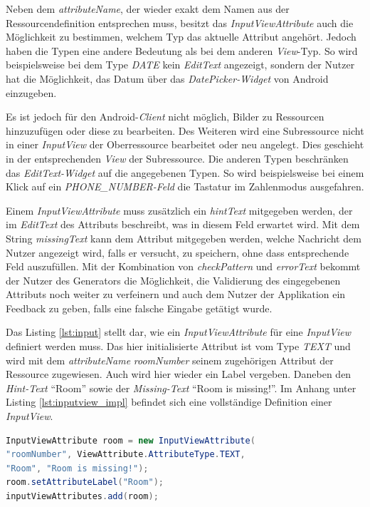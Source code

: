 Neben dem \textit{attributeName}, der wieder exakt dem Namen aus der Ressourcendefinition entsprechen muss, besitzt das \textit{InputViewAttribute} auch die Möglichkeit zu bestimmen, welchem Typ das aktuelle Attribut angehört. Jedoch haben die Typen eine andere Bedeutung als bei dem anderen \textit{View}-Typ. So wird beispielsweise bei dem Type \textit{DATE} kein \textit{EditText} angezeigt, sondern der Nutzer hat die Möglichkeit, das Datum über das \textit{DatePicker-Widget} von Android einzugeben. 

Es ist jedoch für den Android-\textit{Client} nicht möglich, Bilder zu Ressourcen hinzuzufügen oder diese zu bearbeiten. Des Weiteren wird eine Subressource nicht in einer \textit{InputView} der Oberressource bearbeitet oder neu angelegt. Dies geschieht in der entsprechenden \textit{View} der Subressource. Die anderen Typen beschränken das \textit{EditText-Widget} auf die angegebenen Typen. So wird beispielsweise bei einem Klick auf ein \textit{PHONE\_NUMBER-Feld} die Tastatur im Zahlenmodus ausgefahren.

Einem \textit{InputViewAttribute} muss zusätzlich ein \textit{hintText} mitgegeben werden, der im \textit{EditText} des Attributs beschreibt, was in diesem Feld erwartet wird. Mit dem String \textit{missingText} kann dem Attribut mitgegeben werden, welche Nachricht dem Nutzer angezeigt wird, falls er versucht, zu speichern, ohne dass entsprechende Feld auszufüllen. Mit der Kombination von \textit{checkPattern} und \textit{errorText} bekommt der Nutzer des Generators die Möglichkeit, die Validierung des eingegebenen Attributs noch weiter zu verfeinern und auch dem Nutzer der Applikation ein Feedback zu geben, falls eine falsche Eingabe getätigt wurde.

Das Listing \ref{lst:input} stellt dar, wie ein \textit{InputViewAttribute} für eine \textit{InputView} definiert werden muss. Das hier initialisierte Attribut ist vom Type \textit{TEXT} und wird mit dem \textit{attributeName} \textit{roomNumber} seinem zugehörigen Attribut der Ressource zugewiesen.
Auch wird hier wieder ein Label vergeben. Daneben den \textit{Hint-Text} \enquote{Room} sowie der \textit{Missing-Text} \enquote{Room is missing!}.
Im Anhang unter Listing \ref{lst:inputview_impl} befindet sich eine vollständige Definition einer \textit{InputView}.

\begin{lstlisting}[label=lst:input,
language=java,
firstnumber=1,
caption=Definition eines \textit{InputViewAttributes} einer \textit{InputView}.]	
InputViewAttribute room = new InputViewAttribute(
"roomNumber", ViewAttribute.AttributeType.TEXT, 
"Room", "Room is missing!");
room.setAttributeLabel("Room");
inputViewAttributes.add(room);
\end{lstlisting}

